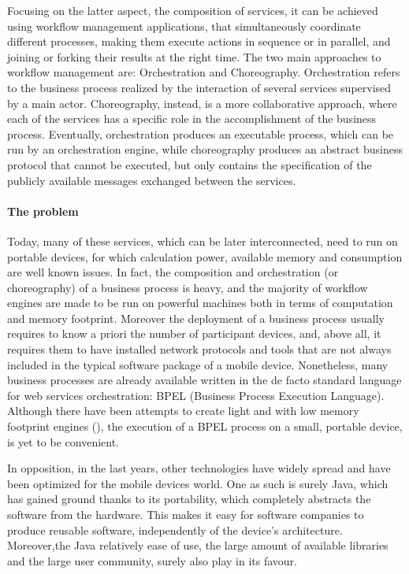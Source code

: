 Focusing on the latter aspect, the composition of services, it can be achieved using workflow management applications, that simultaneously coordinate different processes, making them execute actions in sequence or in parallel, and joining or forking their results at the right time. %
The two main approaches to workflow management are: Orchestration and Choreography.
Orchestration refers to the %
business process realized by the interaction of several services supervised by a main actor. Choreography, instead, is a more collaborative approach, where each of the services has a specific role in the accomplishment of the business process. Eventually, orchestration produces an executable process, which can be run by an orchestration engine, while choreography produces an abstract business protocol that cannot be executed, but only contains the specification of the publicly available messages exchanged between the services.

\paragraph{The problem}
Today, many of these services, which can be later interconnected, need to run on portable devices, for which calculation power, available memory and consumption are well known issues. In fact, the composition and orchestration (or choreography) of a business process is heavy, and the majority of workflow engines are made to be run on powerful machines both in terms of computation and memory footprint. Moreover the deployment of a business process usually requires to know a priori the number of participant devices, and, above all, it requires them to have installed network protocols and tools that are not always included in the typical software package of a mobile device. 
Nonetheless, many business processes are already available written in the de facto standard language for web services orchestration: BPEL (Business Process Execution Language). Although there have been attempts to create light and with low memory footprint engines (\cite{dddd}), the execution of a BPEL process on a small, portable device, is yet to be convenient.

In opposition, in the last years, other technologies have widely spread and have been optimized for the mobile devices world. One as such is surely Java, which has gained ground thanks to its portability, which completely abstracts the software from the hardware. This makes it easy for software companies to produce reusable software, independently of the device's architecture. Moreover,the Java relatively ease of use, the large amount of available libraries and the large user community, surely also play in its favour. 

